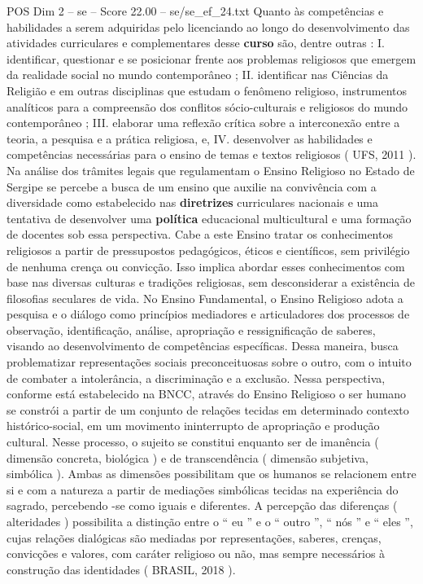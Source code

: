 \begin{textsample}{POS Dim 2 – se – Score 22.00 – se/se\_ef\_24.txt}
Quanto às competências e habilidades a serem adquiridas pelo licenciando ao longo do desenvolvimento das atividades curriculares e complementares desse \textbf{curso} são, dentre outras : I. identificar, questionar e se posicionar frente aos problemas religiosos que emergem da realidade social no mundo contemporâneo ; II. identificar nas Ciências da Religião e em outras disciplinas que estudam o fenômeno religioso, instrumentos analíticos para a compreensão dos conflitos sócio-culturais e religiosos do mundo contemporâneo ; III. elaborar uma reflexão crítica sobre a interconexão entre a teoria, a pesquisa e a prática religiosa, e, IV. desenvolver as habilidades e competências necessárias para o ensino de temas e textos religiosos ( UFS, 2011 ).
Na análise dos trâmites legais que regulamentam o Ensino Religioso no Estado de Sergipe se percebe a busca de um ensino que auxilie na convivência com a diversidade como estabelecido nas \textbf{diretrizes} curriculares nacionais e uma tentativa de desenvolver uma \textbf{política} educacional multicultural e uma formação de docentes sob essa perspectiva.
Cabe a este Ensino tratar os conhecimentos religiosos a partir de pressupostos pedagógicos, éticos e científicos, sem privilégio de nenhuma crença ou convicção.
Isso implica abordar esses conhecimentos com base nas diversas culturas e tradições religiosas, sem desconsiderar a existência de filosofias seculares de vida.
No Ensino Fundamental, o Ensino Religioso adota a pesquisa e o diálogo como princípios mediadores e articuladores dos processos de observação, identificação, análise, apropriação e ressignificação de saberes, visando ao desenvolvimento de competências específicas.
Dessa maneira, busca problematizar representações sociais preconceituosas sobre o outro, com o intuito de combater a intolerância, a discriminação e a exclusão.
Nessa perspectiva, conforme está estabelecido na BNCC, através do Ensino Religioso o ser humano se constrói a partir de um conjunto de relações tecidas em determinado contexto histórico-social, em um movimento ininterrupto de apropriação e produção cultural.
Nesse processo, o sujeito se constitui enquanto ser de imanência ( dimensão concreta, biológica ) e de transcendência ( dimensão subjetiva, simbólica ).
Ambas as dimensões possibilitam que os humanos se relacionem entre si e com a natureza a partir de mediações simbólicas tecidas na experiência do sagrado, percebendo -se como iguais e diferentes.
A percepção das diferenças ( alteridades ) possibilita a distinção entre o “ eu ” e o “ outro ”, “ nós ” e “ eles ”, cujas relações dialógicas são mediadas por representações, saberes, crenças, convicções e valores, com caráter religioso ou não, mas sempre necessários à construção das identidades ( BRASIL, 2018 ).

\end{textsample}
